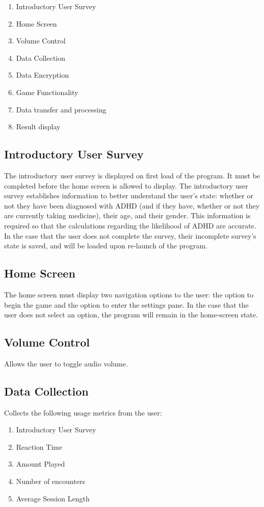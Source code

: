 \documentclass[a4wide]{article}
\begin{document}
\begin{enumerate}
\item Introductory User Survey
\item Home Screen
\item Volume Control
\item Data Collection
\item Data Encryption
\item Game Functionality
\item Data transfer and processing
\item Result display
\end{enumerate}


\subsection{Introductory User Survey}
The introductory user survey is displayed on first load of the program. It must
be completed before the home screen is allowed to display. The introductory user
survey establishes information to better understand the user's state: whether or
not they have been diagnosed with ADHD (and if they have, whether or not they
are currently taking medicine), their age, and their gender. This information is
required so that the calculations regarding the likelihood of ADHD are accurate.
In the case that the user does not complete the survey, their incomplete
survey's state is saved, and will be loaded upon re-launch of the program.

\subsection{Home Screen}
The home screen must display two navigation options to the user: the option to
begin the game and the option to enter the settings pane. In the case that the
user does not select an option, the program will remain in the home-screen
state.

\subsection{Volume Control}
Allows the user to toggle audio volume.

\subsection{Data Collection}
Collects the following usage metrics from the user:
\begin{enumerate}
\item Introductory User Survey
\item Reaction Time
\item Amount Played
\item Number of encounters
\item Average Session Length
\end{enumerate}
\end{document}
